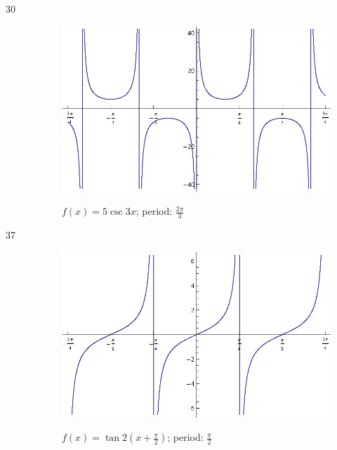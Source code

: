 \documentclass{exam}
\begin{document}
\begin{description}
      \item[30]
        \begin{figure}[H]
          \centering
          \includegraphics[scale=0.9]{exercise30.eps}

          $f(x) = 5 \csc 3x $; period: $\frac{2 \pi}{3}$
        \end{figure}

      \item[37]
        \begin{figure}[H]
          \centering
          \includegraphics[scale=0.9]{exercise37.eps}

          $f(x) = \tan 2 \left( x + \frac{\pi}{2} \right) $; period: $\frac{\pi}{2}$
        \end{figure}


\end{description}
\end{document}
